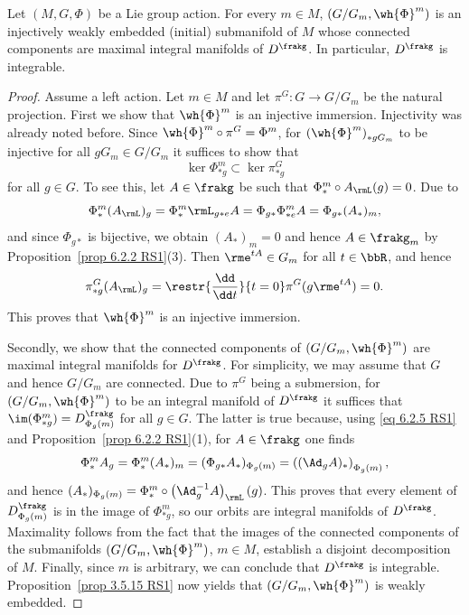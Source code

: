 \begin{thm}\label{thm 6.2.8 RS1 orbit}
    Let $(M,G,\Phi)$ be a Lie group action. For every $m\in M$, $(G\slash G_m,\wh{\Phi}^m)$ is an injectively weakly embedded (initial) submanifold of $M$ whose connected components are maximal integral manifolds of $D^\frakg$. In particular, $D^\frakg$ is integrable.
\end{thm}
\begin{proof}
    Assume a left action. Let $m\in M$ and let $\pi^G:G\to G\slash G_m$ be the natural projection. First we show that $\wh{\Phi}^m$ is an injective immersion. Injectivity was already noted before. Since $\wh{\Phi}^m\circ \pi^G=\Phi^m$, for $\left(\wh{\Phi}^m\right)_{\ast gG_m}$ to be injective for all $gG_m\in G\slash G_m$ it suffices to show that
    \[\ker \Phi^m_{\ast g}\subset \ker \pi^G_{\ast g}\]
    for all $g\in G$. To see this, let $A\in\frakg$ be such that $\Phi^m_{\ast}\circ A_\rmL(g)=0$. Due to
    \[\Phi^m_{\ast}(A_\rmL)_g=\Phi^m_{\ast}\rmL_{g\ast e}A=\Phi_{g\ast}\Phi^m_{\ast e}A=\Phi_{g\ast}(A_\ast)_m,\label{eq 6.2.5 RS1}\]
    and since $\Phi_{g\ast}$ is bijective, we obtain $(A_\ast)_m=0$ and hence $A\in\frakg_m$ by Proposition~\ref{prop 6.2.2 RS1}(3). Then $\rme^{tA}\in G_m$ for all $t\in\bbR$, and hence
    \[\pi^G_{\ast g}(A_\rmL)_g=\restr{\frac{\dd}{\dd t}}{t=0}\pi^G(g\rme^{tA})=0.\]
    This proves that $\wh{\Phi}^m$ is an injective immersion.

    Secondly, we show that the connected components of $(G\slash G_m,\wh{\Phi}^m)$ are maximal integral manifolds for $D^\frakg$. For simplicity, we may assume that $G$ and hence $G\slash G_m$ are connected. Due to $\pi^G$ being a submersion, for $(G\slash G_m,\wh{\Phi}^m)$ to be an integral manifold of $D^\frakg$ it suffices that $\im(\Phi^m_{\ast g})=D^\frakg_{\Phi_g(m)}$ for all $g\in G$. The latter is true because, using  \eqref{eq 6.2.5 RS1} and Proposition~\ref{prop 6.2.2 RS1}(1), for $A\in\frakg$ one finds
    \[\Phi^m_{\ast}A_g=\Phi^m_{\ast}(A_\ast)_m=(\Phi_{g\ast}A_\ast)_{\Phi_g(m)}=\left((\Ad_g A)_\ast\right)_{\Phi_g(m)},\]
    and hence $(A_\ast)_{\Phi_g(m)}=\Phi^m_{\ast}\circ\left(\Ad_g^{-1}A\right)_\rmL(g)$. This proves that every element of $D^\frakg_{\Phi_g(m)}$ is in the image of $\Phi^m_{\ast g}$, so our orbits are integral manifolds of $D^\frakg$. Maximality follows from the fact that the images of the connected components of the submanifolds $(G\slash G_m,\wh{\Phi}^m)$, $m\in M$, establish a disjoint decomposition of $M$. Finally, since $m $ is arbitrary, we can conclude that $D^\frakg$ is integrable. Proposition~\ref{prop 3.5.15 RS1} now yields that $(G\slash G_m,\wh{\Phi}^m)$ is weakly embedded.
\end{proof}

